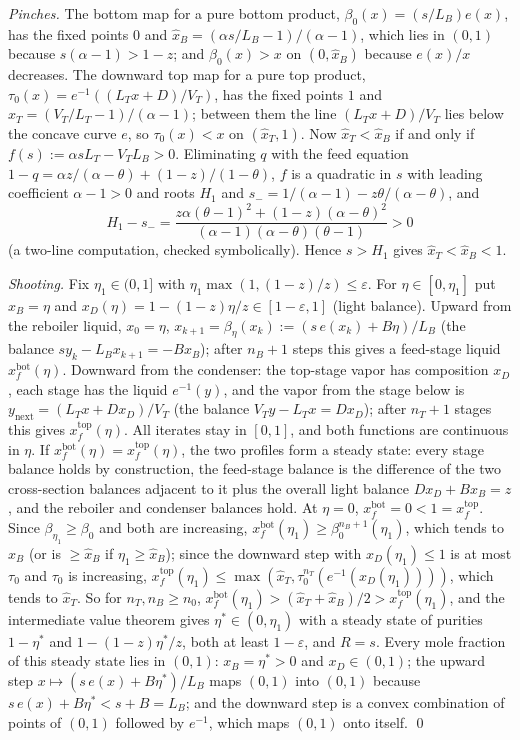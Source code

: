\documentclass[11pt,a4paper]{report}
\begin{document}
\emph{Pinches.} The bottom map for a pure bottom product, \(\beta_0(x)=(s/L_B)e(x)\), has the fixed points \(0\) and
\(\hat x_B=(\alpha s/L_B-1)/(\alpha-1)\), which lies in \((0,1)\) because \(s(\alpha-1)>1-z\); and \(\beta_0(x)>x\) on \((0,\hat x_B)\) because
\(e(x)/x\) decreases. The downward top map for a pure top product, \(\tau_0(x)=e^{-1}((L_Tx+D)/V_T)\), has the fixed points \(1\)
and \(\hat x_T=(V_T/L_T-1)/(\alpha-1)\); between them the line \((L_Tx+D)/V_T\) lies below the concave curve \(e\), so \(\tau_0(x)<x\)
on \((\hat x_T,1)\). Now \(\hat x_T<\hat x_B\) if and only if \(f(s):=\alpha sL_T-V_TL_B>0\). Eliminating \(q\) with the feed equation
\(1-q=\alpha z/(\alpha-\theta)+(1-z)/(1-\theta)\), \(f\) is a quadratic in \(s\) with leading coefficient \(\alpha-1>0\) and roots \(H_1\) and
\(s_-=1/(\alpha-1)-z\theta/(\alpha-\theta)\), and
\[H_1-s_-=\frac{z\alpha(\theta-1)^2+(1-z)(\alpha-\theta)^2}{(\alpha-1)(\alpha-\theta)(\theta-1)}>0\]
(a two-line computation, checked symbolically). Hence \(s>H_1\) gives \(\hat x_T<\hat x_B<1\).

\emph{Shooting.} Fix \(\eta_1\in(0,1]\) with \(\eta_1\max(1,(1-z)/z)\le\varepsilon\). For \(\eta\in[0,\eta_1]\) put \(x_B=\eta\) and
\(x_D(\eta)=1-(1-z)\eta/z\in[1-\varepsilon,1]\) (light balance). Upward from the reboiler liquid,
\(x_0=\eta\), \(x_{k+1}=\beta_\eta(x_k):=(s\,e(x_k)+B\eta)/L_B\) (the balance \(sy_k-L_Bx_{k+1}=-Bx_B\)); after \(n_B+1\) steps this gives a
feed-stage liquid \(x^{\mathrm{bot}}_f(\eta)\). Downward from the condenser: the top-stage vapor has composition \(x_D\), each stage
has the liquid \(e^{-1}(y)\), and the vapor from the stage below is \(y_{\mathrm{next}}=(L_Tx+Dx_D)/V_T\) (the balance
\(V_Ty-L_Tx=Dx_D\)); after \(n_T+1\) stages this gives \(x^{\mathrm{top}}_f(\eta)\). All iterates stay in \([0,1]\), and both functions are
continuous in \(\eta\). If \(x^{\mathrm{bot}}_f(\eta)=x^{\mathrm{top}}_f(\eta)\), the two profiles form a steady state: every stage balance
holds by construction, the feed-stage balance is the difference of the two cross-section balances adjacent to it plus the
overall light balance \(Dx_D+Bx_B=z\), and the reboiler and condenser balances hold. At \(\eta=0\), \(x^{\mathrm{bot}}_f=0<1=x^{\mathrm{top}}_f\). Since \(\beta_{\eta_1}\ge\beta_0\) and both are increasing,
\(x^{\mathrm{bot}}_f(\eta_1)\ge\beta_0^{n_B+1}(\eta_1)\), which tends to \(\hat x_B\) (or is \(\ge\hat x_B\) if \(\eta_1\ge\hat x_B\)); since the
downward step with \(x_D(\eta_1)\le1\) is at most \(\tau_0\) and \(\tau_0\) is increasing,
\(x^{\mathrm{top}}_f(\eta_1)\le\max(\hat x_T,\tau_0^{n_T}(e^{-1}(x_D(\eta_1))))\), which tends to \(\hat x_T\). So for \(n_T,n_B\ge n_0\),
\(x^{\mathrm{bot}}_f(\eta_1)>(\hat x_T+\hat x_B)/2>x^{\mathrm{top}}_f(\eta_1)\), and the intermediate value theorem gives \(\eta^*\in(0,\eta_1)\)
with a steady state of purities \(1-\eta^*\) and \(1-(1-z)\eta^*/z\), both at least \(1-\varepsilon\), and \(R=s\). Every mole fraction of this steady state lies in \((0,1)\): \(x_B=\eta^*>0\) and
\(x_D\in(0,1)\); the upward step \(x\mapsto(s\,e(x)+B\eta^*)/L_B\) maps \((0,1)\) into \((0,1)\) because \(s\,e(x)+B\eta^*<s+B=L_B\); and the
downward step is a convex combination of points of \((0,1)\) followed by \(e^{-1}\), which maps \((0,1)\) onto itself. \qed
\end{document}
